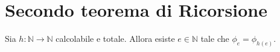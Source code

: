 \section{Secondo teorema di Ricorsione}

Sia $h : \mathbb{N} \rightarrow \mathbb{N}$ calcolabile e totale. Allora esiste $e \in \mathbb{N}$ tale che $\phi_e = \phi_{h(e)}$. 